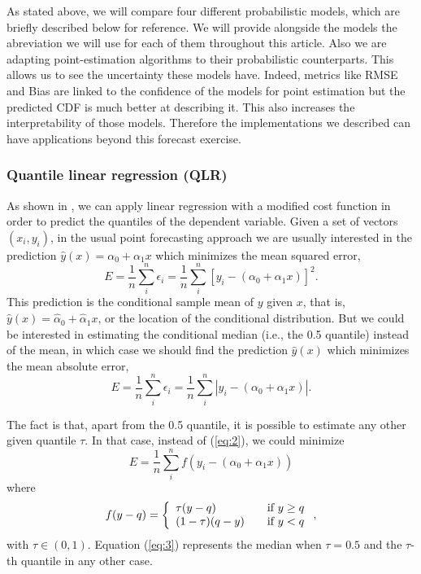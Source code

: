 \documentclass[a4paper,twocolumn,5p]{elsarticle}
\begin{document}
As stated above, we will compare four different probabilistic models,
which are briefly described below for reference. We will provide 
alongside the models the abreviation we will use for each of them 
throughout this article. Also we are adapting point-estimation 
algorithms to their probabilistic counterparts. This allows 
us to see the uncertainty these models have. Indeed, metrics like 
RMSE and Bias are linked to the confidence of the models for 
point estimation but the predicted CDF is much better at describing 
it. This also increases the interpretability of those models.
Therefore 
the implementations we described can have applications beyond 
this forecast exercise.

\subsubsection{Quantile linear regression (QLR)}

As shown in \cite{koenker_quantile_2001}, we can apply linear
regression with a modified cost function in order to predict the
quantiles of the dependent variable.  Given a set of vectors
$(x_i, y_i)$, in the usual point forecasting approach we are usually
interested in the prediction $\hat y(x) = \alpha_0 + \alpha_1 x$ which
minimizes the mean squared error,
\begin{equation}
  \label{eq:1}
  E = \frac{1}{n} \sum^n_i \epsilon_i =
  \frac{1}{n} \sum^n_i [ y_i - (\alpha_0 + \alpha_1 x) ]^2.
\end{equation}
This prediction is the conditional sample mean of $y$ given $x$, that
is, $\hat y(x) = \hat\alpha_0 + \hat\alpha_1 x$, or the location of
the conditional distribution. But we could be interested in estimating
the conditional median (i.e., the 0.5 quantile) instead of the mean,
in which case we should find the prediction $\hat y(x)$ which
minimizes the mean absolute error,
\begin{equation}
  \label{eq:2}
  E = \frac{1}{n} \sum^n_i \epsilon_i =
  \frac{1}{n} \sum^n_i | y_i - (\alpha_0 + \alpha_1 x) |.
\end{equation}

The fact is that, apart from the 0.5 quantile, it is possible to
estimate any other given quantile $\tau$. In that case, instead of
(\ref{eq:2}), we could minimize
\begin{equation}
  \label{eq:3}
  E= \frac{1}{n} \sum^n_i f( y_i - (\alpha_0 + \alpha_1 x))
\end{equation}
where
\begin{equation}
  \label{eq:4}
  f(y-q) = \left\{ 
    \begin{array}{l l}
      \tau (y-q) & \quad \mbox{if $y \ge q$}\\
      (1-\tau) (q-y) & \quad \mbox{if $y < q$}\\
    \end{array} \right.,
\end{equation}
with $\tau \in (0,1)$. Equation (\ref{eq:3}) represents the median
when $\tau=0.5$ and the $\tau$-th quantile in any other case.
\end{document}
